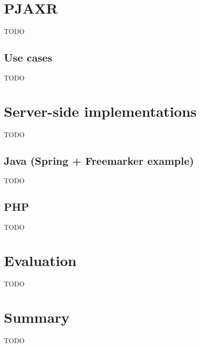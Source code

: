 \documentclass[f,bachelor,binding,twoside,palatino]{WeSTthesis}
\def \pjaxr {PJAXR}
\begin{document}
\section{\pjaxr{}}
  TODO
  
  \subsection{Use cases}
  TODO
  
\section{Server-side implementations}
TODO

  \subsection{Java (Spring + Freemarker example)}
  TODO

    \subsection{PHP}
    TODO

\section{Evaluation}
TODO
  
\section{Summary}
TODO
\end{document}
